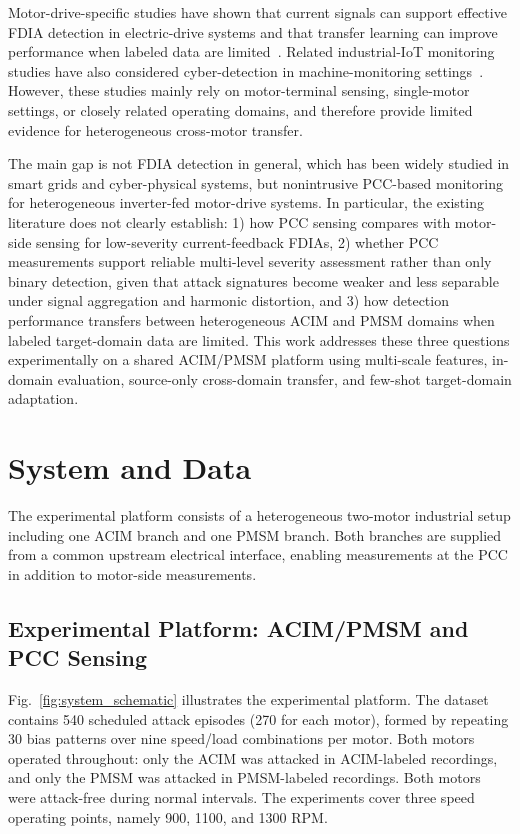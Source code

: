 \documentclass[letterpaper,journal]{IEEEtran}
\begin{document}
Motor-drive-specific studies have shown that current signals can support effective FDIA detection in electric-drive systems and that transfer learning can improve performance when labeled data are limited~\cite{Yang2022Fast,Yang2024Enhanced}. Related industrial-IoT monitoring studies have also considered cyber-detection in machine-monitoring settings~\cite{423563247547}. However, these studies mainly rely on motor-terminal sensing, single-motor settings, or closely related operating domains, and therefore provide limited evidence for heterogeneous cross-motor transfer.





The main gap is not FDIA detection in general, which has been widely studied in smart grids and cyber-physical systems, but nonintrusive PCC-based monitoring for heterogeneous inverter-fed motor-drive systems. In particular, the existing literature does not clearly establish: 1) how PCC sensing compares with motor-side sensing for low-severity current-feedback FDIAs, 2) whether PCC measurements support reliable multi-level severity assessment rather than only binary detection, given that attack signatures become weaker and less separable under signal aggregation and harmonic distortion, and 3) how detection performance transfers between heterogeneous ACIM and PMSM domains when labeled target-domain data are limited. This work addresses these three questions experimentally on a shared ACIM/PMSM platform using multi-scale features, in-domain evaluation, source-only cross-domain transfer, and few-shot target-domain adaptation.

\section{System and Data}

\label{sec:system_data}

The experimental platform consists of a heterogeneous two-motor industrial setup including one ACIM branch and one PMSM branch. Both branches are supplied from a common upstream electrical interface, enabling measurements at the PCC in addition to motor-side measurements.
\subsection{Experimental Platform: ACIM/PMSM and PCC Sensing}
\label{sec:experimental_platform}

Fig.~\ref{fig:system_schematic} illustrates the experimental platform.
The dataset contains 540 scheduled attack episodes (270 for each motor), formed by repeating 30 bias patterns over nine speed/load combinations per motor. Both motors operated throughout: only the ACIM was attacked in ACIM-labeled recordings, and only the PMSM was attacked in PMSM-labeled recordings. Both motors were attack-free during normal intervals. The experiments cover three speed operating points, namely 900, 1100, and 1300 RPM.
\end{document}
